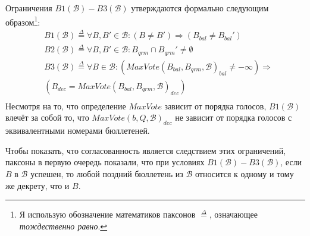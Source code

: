 \documentclass[12pt, a4paper]{article} %
\begin{document}
Ограничения  $B1(\mathcal{B}) - B3(\mathcal{B})$ утверждаются формально следующим образом\footnote{Я использую обозначение математиков паксонов $\overset{\Delta}{=}$, означающее \textit{тождественно равно}.}:
\begin{align*}
    &B1(\mathcal{B}) \overset{\Delta}{=} \forall B, B' \in \mathcal{B} : (B \neq B') \Rightarrow (B_{bal} \neq B_{bal}') \\
    &B2(\mathcal{B}) \overset{\Delta}{=} \forall B, B' \in \mathcal{B} : B_{qrm} \cap B_{qrm}' \neq \emptyset \\
    &B3(\mathcal{B}) \overset{\Delta}{=} \forall B \in \mathcal{B} : (MaxVote(B_{bal}, B_{qrm}, \mathcal{B})_{bal} \neq - \infty) \Rightarrow \\
    &(B_{dec} = MaxVote(B_{bal}, B_{qrm}, \mathcal{B})_{dec}) \\
\end{align*}
Несмотря на то, что определение $MaxVote$ зависит от порядка голосов, $B1(\mathcal{B})$ влечёт за собой то, что $MaxVote(b, Q, \mathcal{B})_{dec}$ не зависит от порядка голосов с эквивалентными номерами бюллетеней.

Чтобы показать, что согласованность является следствием этих ограничений, паксоны в первую очередь показали, что при условиях $B1(\mathcal{B}) - B3(\mathcal{B})$, если $B$ в $\mathcal{B}$ успешен, то любой поздний бюллетень из $\mathcal{B}$ относится к одному и тому же декрету, что и $B$.
\end{document}
